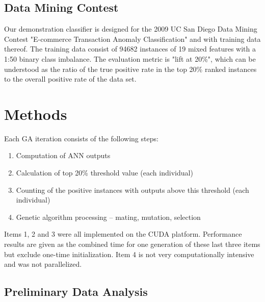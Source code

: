 \documentclass[11pt]{article}       %
\begin{document}
\subsection{Data Mining Contest} \label{contest}
Our demonstration classifier is designed for the 2009 UC San Diego Data Mining Contest "E-commerce Transaction Anomaly Classification" and with training data thereof. The training data consist of 94682 instances of 19 mixed features with a 1:50 binary class imbalance. The evaluation metric is "lift at 20\%", which can be understood as the ratio of the true positive rate in the top 20\% ranked instances to the overall positive rate of the data set.

\section{Methods} \label{algimp}
Each GA iteration consists of the following steps:
\begin{enumerate}
	\item Computation of ANN outputs
	\item Calculation of top 20\% threshold value (each individual)
	\item Counting of the positive instances with outputs above this threshold (each individual)
	\item Genetic algorithm processing -- mating, mutation, selection
\end{enumerate}

Items 1, 2 and 3 were all implemented on the CUDA platform. Performance results are given as the combined time for one generation of these last three items but exclude one-time initialization. Item 4 is not very computationally intensive and was not parallelized. 

\subsection{Preliminary Data Analysis} \label{prelim}

\end{document}
